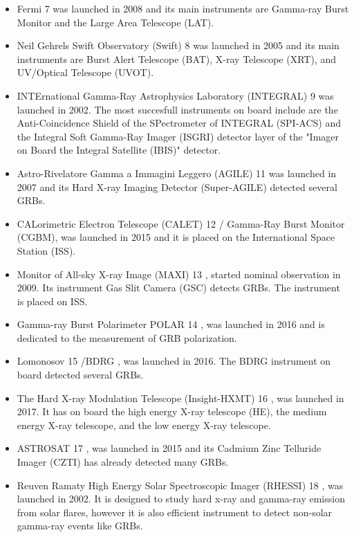 \documentclass[12pt, a4paper,titlepage]{article}
\numberwithin{equation}{section}
\numberwithin{figure}{section}
\begin{document}
\begin{itemize}
\item Fermi 7 \cite{grb28} was launched in 2008 and its main instruments are Gamma-ray Burst Monitor and the Large Area Telescope (LAT). 
\item Neil Gehrels Swift Observatory (Swift) 8 \cite{grb31} was launched in 2005 and its main instruments are Burst Alert Telescope (BAT), X-ray Telescope (XRT), and UV/Optical Telescope (UVOT).
\item INTErnational Gamma-Ray Astrophysics Laboratory (INTEGRAL) 9 \cite{grb32} was launched in 2002. The most succesfull instruments on board include are the Anti-Coincidence Shield of the SPectrometer of INTEGRAL (SPI-ACS) and the Integral Soft Gamma-Ray Imager (ISGRI) detector layer of the "Imager on Board the Integral Satellite (IBIS)" detector.
\item Astro-Rivelatore Gamma a Immagini Leggero (AGILE) 11 \cite{grb34} was launched in 2007 and its Hard X-ray Imaging Detector (Super-AGILE) detected several GRBs.
\item CALorimetric Electron Telescope (CALET) 12 \cite{grb35} / Gamma-Ray Burst Monitor (CGBM), was launched in 2015 and it is placed on the International Space Station (ISS).
\item Monitor of All-sky X-ray Image (MAXI) 13 \cite{grb36}, started nominal observation in 2009. Its instrument Gas Slit Camera (GSC) detects GRBs. The instrument is placed on ISS.
\item Gamma-ray Burst Polarimeter POLAR 14 \cite{grb37}, was launched in 2016 and is dedicated to the measurement of GRB polarization.
\item Lomonosov 15 /BDRG \cite{grb38}, was launched in 2016. The BDRG instrument on board detected several GRBs.
\item The Hard X-ray Modulation Telescope (Insight-HXMT) 16 \cite{grb39}, was launched in 2017. It has on board the high energy X-ray telescope (HE), the medium energy X-ray telescope, and the low energy X-ray telescope.
\item ASTROSAT 17 \cite{grb40}, was launched in 2015 and its Cadmium Zinc Telluride Imager (CZTI) has already detected many GRBs.
\item Reuven Ramaty High Energy Solar Spectroscopic Imager (RHESSI) 18 \cite{grb41}, was launched in 2002. It is designed to study hard x-ray and gamma-ray emission from solar flares, however it is also efficient instrument to detect non-solar gamma-ray events like GRBs.
\end{itemize}
\end{document}
